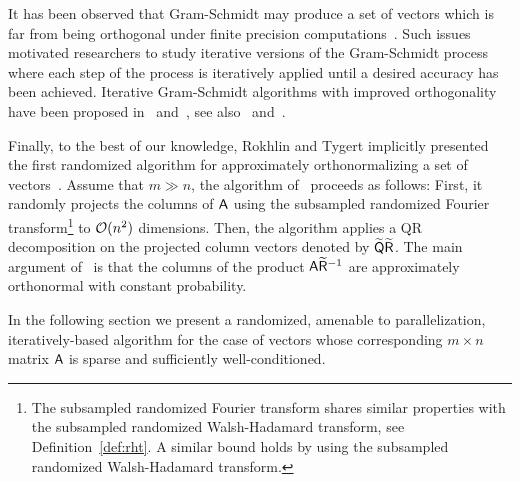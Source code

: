 %
It has been observed that Gram-Schmidt may produce a set of vectors which is far from being orthogonal under finite precision computations~\cite{QR:Bj67}. Such issues motivated researchers to study iterative versions of the Gram-Schmidt process where each step of the process is iteratively applied until a desired accuracy has been achieved. Iterative Gram-Schmidt algorithms with improved orthogonality have been proposed in~\cite{QR:DGKS} and~\cite{QR:Ruhe}, see also~\cite{QR:Hoffman,QR:numericsII} and~\cite{QR:USSR}.
%

%
Finally, to the best of our knowledge, Rokhlin and Tygert implicitly presented the first randomized algorithm for approximately orthonormalizing a set of vectors~\cite{RT08}. Assume that $m\gg n$, the algorithm of~\cite{RT08} proceeds as follows: First, it randomly projects the columns of ${\mathsf{A} }$ using the subsampled randomized Fourier transform\footnote{The subsampled randomized Fourier transform shares similar properties with the subsampled randomized Walsh-Hadamard transform, see Definition~\ref{def:rht}. A similar bound holds by using the subsampled randomized Walsh-Hadamard transform.} to $\mathcal{O}(n^2)$ dimensions. Then, the algorithm applies a QR decomposition on the projected column vectors denoted by $\widetilde{{\mathsf{Q} }}\widetilde{{\mathsf{R} }}$. The main argument of~\cite{RT08} is that the columns of the product ${\mathsf{A} } \widetilde{{\mathsf{R} }}^{-1}$ are approximately orthonormal with constant probability.
%

%
In the following section we present a randomized, amenable to parallelization, iteratively-based algorithm for the case of vectors whose corresponding $m\times n$ matrix ${\mathsf{A} }$ is sparse and sufficiently well-conditioned.


%

